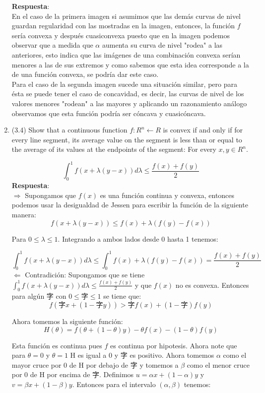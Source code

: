 \documentclass[12pt, oneside]{article}%
\begin{document}
\begin{enumerate}
\textbf{Respuesta}: \\
En el caso de la primera imagen si asumimos que las demás curvas de nivel guardan regularidad con las mostradas en la imagen, entonces, la función $f$ sería convexa y después cuasiconvexa puesto que en la imagen podemos observar que a medida que $\alpha$ aumenta su curva de nivel "rodea" a las anteriores, esto indica que las imágenes de una combinación convexa serían menores a las de sus extremos y como sabemos que esta idea corresponde a la de una función convexa, se podría dar este caso.\\
Para el caso de la segunda imagen sucede una situación similar, pero para ésta se puede tener el caso de concavidad, es decir, las curvas de nivel de los valores menores "rodean" a las mayores y aplicando un razonamiento análogo observamos que esta función podría ser cóncava y cuasicóncava.

\item (3.4) Show that a continuous function $f: R^n \leftarrow R$ is convex if and only if for every line segment, its average value on the segment is less than or equal to the average of its values at the endpoints of the segment: For every $x, y \in R^n$.

$$ \int_0^1 f(x+\lambda(y-x)) d\lambda \leq \frac{f(x) + f(y)}{2}$$
\textbf{Respuesta}: \\
$\Rightarrow$ Supongamos que $f(x)$ es una función continua y convexa, entonces podemos usar la desigualdad de Jessen para escribir la función de la siguiente manera: 
$$f(x + \lambda(y-x)) \leq f(x) + \lambda(f(y) - f(x)) $$

Para $0\leq \lambda \leq 1$. Integrando a ambos lados desde 0 hasta 1 tenemos:

$$ \int_0^1 f(x+\lambda(y-x)) d\lambda \leq \int_0^1 f(x) + \lambda(f(y) - f(x)) = \frac{f(x) + f(y)}{2} $$
$\Leftarrow$ Contradición: Supongamos que se tiene $ \int_0^1 f(x+\lambda(y-x)) d\lambda \leq \frac{f(x) + f(y)}{2}$ y que $f(x)$ no es convexa. Entonces para algún 字 con $0\leq \text{字} \leq 1$ se tiene que: 
$$f(\text{字}x + (1-\text{字}y)) > \text{字}f(x) + (1-\text{字})f(y)$$

Ahora tomemos la siguiente función:
$$H(\theta) = f(\theta + (1-\theta)y) - \theta f(x) -(1-\theta)f(y)$$

Esta función es continua pues $f$ es continua por hipotesis. Ahora note que para $\theta = 0$ y $\theta = 1$ H es igual a 0 y 字 es positivo. Ahora tomemos $\alpha$ como el mayor cruce por 0 de H por debajo de 字 y tomemos a $\beta$ como el menor cruce por 0 de H por encima de 字. Definimos $u = \alpha x+ (1- \alpha)y $ y $v = \beta x+ (1- \beta)y$. Entonces para el intervalo $(\alpha, \beta)$ tenemos: 


\end{enumerate}
\end{document}
